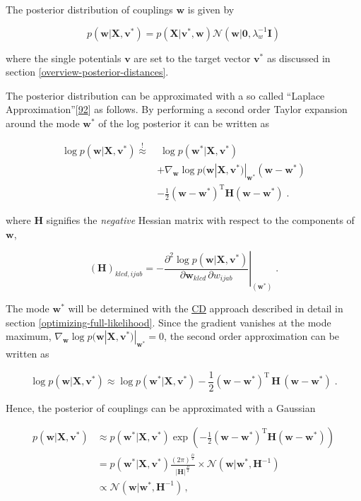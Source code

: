 \documentclass[11pt,a4paper,twoside]{book}
\newcommand{\Gauss}{\mathcal{N}}
\renewcommand{\H}{\mathbf{H}}
\newcommand{\I}{\mathbf{I}}
\renewcommand{\v}{\mathbf{v}}
\newcommand{\w}{\mathbf{w}}
\newcommand{\wijab}{w_{ijab}}
\newcommand{\X}{\mathbf{X}}
\theoremstyle{definition}
\theoremstyle{definition}
\theoremstyle{remark}
\begin{document}
The posterior distribution of couplings \(\w\) is given by

\begin{equation}
p(\w | \X , \v^*) = p(\X | \v^*, \w) \Gauss (\w | \mathbf{0}, \lambda_w^{-1} \I)
\end{equation}

where the single potentials \(\v\) are set to the target vector \(\v^*\)
as discussed in section \ref{overview-posterior-distances}.

The posterior distribution can be approximated with a so called
``Laplace Approximation''{[}\protect\hyperlink{ref-Murphy2012}{92}{]} as
follows. By performing a second order Taylor expansion around the mode
\(\w^*\) of the log posterior it can be written as

\begin{align}
    \log p(\w | \X , \v^*) \overset{!}{\approx} &  \;  \log p(\w^* | \X , \v^*) \nonumber\\
                & + \nabla_\w \log p(\w | \X , \v^*)|_{\w^*}(\w-\w^*) \nonumber\\ 
                & - \frac{1}{2} (\w-\w^*)^{\mathrm{T}} \H (\w-\w^*)  \; .
\end{align}

where \(\H\) signifies the \emph{negative} Hessian matrix with respect
to the components of \(\w\),

\begin{equation}
    (\H)_{klcd, ijab} = - \left. \frac{\partial^2  \log p(\w | \X , \v^{*})}{\partial \w_{klcd} \, \partial \wijab  } \right|_{(\w^{*})} \; .
\end{equation}

The mode \(\w^*\) will be determined with the
\protect\hyperlink{abbrev}{CD} approach described in detail in section
\ref{optimizing-full-likelihood}. Since the gradient vanishes at the
mode maximum, \(\nabla_\w \log p(\w | \X , \v^*)|_{\w^*} = 0\), the
second order approximation can be written as

\begin{equation}
    \log p(\w | \X , \v^*) {\approx}  \log p(\w^* | \X , \v^*)  - \frac{1}{2} (\w-\w^*)^{\mathrm{T}} \, \H \, (\w-\w^*)  \;.
\end{equation}

Hence, the posterior of couplings can be approximated with a Gaussian

\begin{align}
   p(\w | \X , \v^*) &\approx p(\w^* | \X , \v^*) \exp \left( - \frac{1}{2} (\w-\w^*)^{\mathrm{T}} \H  (\w -\w^*) \right) \nonumber \\
              &= p(\w^* | \X , \v^*) \frac{(2 \pi)^\frac{D}{2}} { |\H|^\frac{D}{2}} \times \Gauss (\w | \w^*, \H^{-1} ) \nonumber \\
              &\propto  \Gauss (\w | \w^*, \H^{-1}) \,,
\label{eq:reg-lik-gauss-approx}
\end{align}
\end{document}
